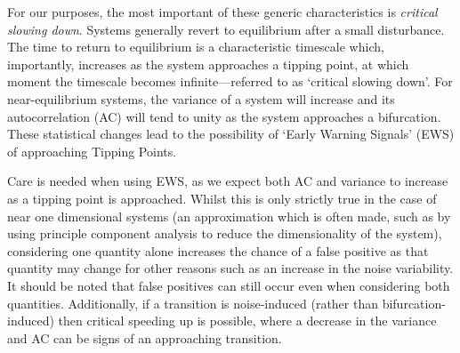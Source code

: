 For our purposes, the most important of these generic characteristics
is \emph{critical slowing down}. Systems generally revert to  equilibrium after a small disturbance. 
The time to return to equilibrium is a characteristic timescale which, importantly, increases as the system 
approaches a tipping point, at which moment the timescale becomes 
infinite\cite{Scheffer2012}---referred to as `critical slowing down'. 
For near-equilibrium systems, the variance of a system will increase and its autocorrelation (AC)
will tend to unity as the system approaches a bifurcation\cite{Scheffer2009,Held2004}.
These statistical changes lead to the possibility of `Early Warning Signals' (EWS) of approaching Tipping Points.

Care is needed when using EWS, as we 
expect both AC and variance to increase as a tipping point is 
approached\cite{Ditlevsen2010}. Whilst this is only strictly true
in the case of near one dimensional systems (an approximation which is often made, such as by using principle component analysis to reduce the 
dimensionality of the system\cite{Held2004}), considering one quantity alone 
increases the chance of a false positive as that quantity may change for other reasons such as an increase in the noise variability. It should 
be noted that false positives can still occur even when considering 
both quantities.
Additionally, 
if a transition is noise-induced (rather than bifurcation-induced) then
critical
speeding up is possible, where
a decrease in the variance and AC can
be signs of an approaching transition\cite{Titus2020}.

